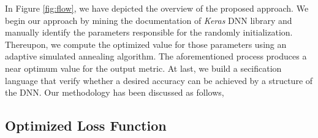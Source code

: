 In Figure \ref{fig:flow}, we have depicted the overview of the proposed approach. We begin our approach by mining the documentation of \emph{Keras} DNN library and manually identify the parameters responsible for the randomly initialization. Thereupon, we compute the optimized value for those parameters using an adaptive simulated annealing algorithm. The aforementioned process produces a near optimum value for the output metric. At last, we build a secification language that verify whether a desired accuracy can be achieved by a structure of the DNN.
Our methodology has been discussed as follows,
\subsection{Optimized Loss Function}
